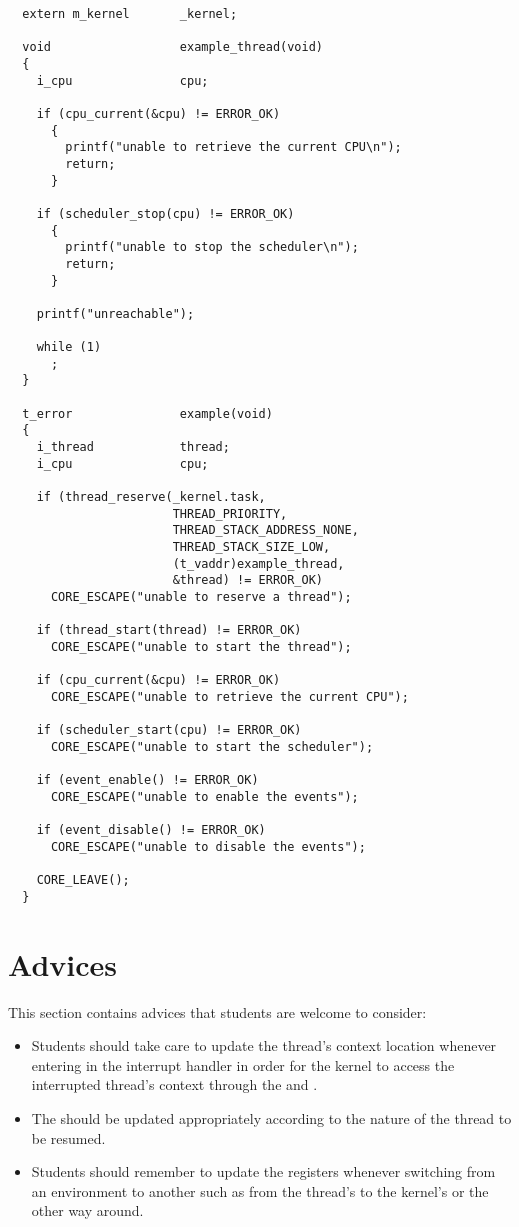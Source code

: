 \begin{verbatim}
  extern m_kernel       _kernel;

  void                  example_thread(void)
  {
    i_cpu               cpu;

    if (cpu_current(&cpu) != ERROR_OK)
      {
        printf("unable to retrieve the current CPU\n");
        return;
      }

    if (scheduler_stop(cpu) != ERROR_OK)
      {
        printf("unable to stop the scheduler\n");
        return;
      }

    printf("unreachable");

    while (1)
      ;
  }

  t_error               example(void)
  {
    i_thread            thread;
    i_cpu               cpu;

    if (thread_reserve(_kernel.task,
                       THREAD_PRIORITY,
                       THREAD_STACK_ADDRESS_NONE,
                       THREAD_STACK_SIZE_LOW,
                       (t_vaddr)example_thread,
                       &thread) != ERROR_OK)
      CORE_ESCAPE("unable to reserve a thread");

    if (thread_start(thread) != ERROR_OK)
      CORE_ESCAPE("unable to start the thread");

    if (cpu_current(&cpu) != ERROR_OK)
      CORE_ESCAPE("unable to retrieve the current CPU");

    if (scheduler_start(cpu) != ERROR_OK)
      CORE_ESCAPE("unable to start the scheduler");

    if (event_enable() != ERROR_OK)
      CORE_ESCAPE("unable to enable the events");

    if (event_disable() != ERROR_OK)
      CORE_ESCAPE("unable to disable the events");

    CORE_LEAVE();
  }
\end{verbatim}

%
%

\section{Advices}

This section contains advices that students are welcome to consider:

\begin{itemize}
  \item
    Students should take care to update the thread's context location
    \ie{}  whenever entering in the interrupt
    handler in order for the kernel to access the interrupted thread's context
    through the  and
    .
  \item
    The  should be updated appropriately
    according to the nature of the thread to be resumed.
  \item
    Students should remember to update the registers whenever switching
    from an environment to another such as from the thread's to the kernel's
    or the other way around.
\end{itemize}
